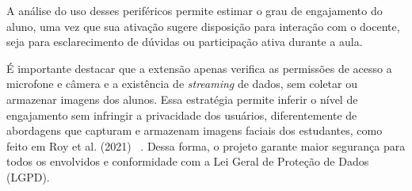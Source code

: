 A análise do uso desses periféricos permite estimar o grau de engajamento do aluno, uma vez que sua ativação sugere disposição para interação com o docente, seja para esclarecimento de dúvidas ou participação ativa durante a aula.

É importante destacar que a extensão apenas verifica as permissões de acesso a microfone e câmera e a existência de \textit{streaming} de dados, sem coletar ou armazenar imagens dos alunos. Essa estratégia permite inferir o nível de engajamento sem infringir a privacidade dos usuários, diferentemente de abordagens que capturam e armazenam imagens faciais dos estudantes, como feito em Roy et al. (2021) ~\cite{roy2021students}. Dessa forma, o projeto garante maior segurança para todos os envolvidos e conformidade com a Lei Geral de Proteção de Dados (LGPD).
